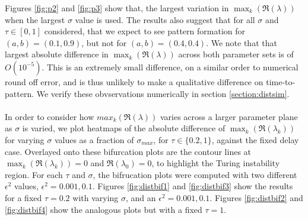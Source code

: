 Figures \ref{fig:p2} and \ref{fig:p3} show that, the largest variation in $\max_k(\Re(\lambda))$ when the largest $\sigma$ value is used. The results also suggest that for all $\sigma$ and $\tau\in[0,1]$ considered, that we expect to see pattern formation for $(a,b)=(0.1,0.9)$, but not for $(a,b)=(0.4,0.4)$. We note that that largest absolute difference in $\max_k(\Re(\lambda))$ across both parameter sets is of $O(10^{-5})$. This is an extremely small difference, on a similar order to numerical round off error, and is thus unlikely to make a qualitative difference on time-to-pattern. We verify these obvservations numerically in section \ref{section:distsim}.
\\\\
 In order to consider how $max_k(\Re(\lambda))$ varies across a larger parameter plane as $\sigma$ is varied, we plot heatmaps of the absolute difference of $\max_k(\Re(\lambda_k))$ for varying $\sigma$ values as a fraction of $\sigma_{max}$, for $\tau\in\{0.2,1\}$, against the fixed delay case. Overlayed onto these bifurcation plots are the contour lines at $\max_k(\Re(\lambda_k))=0$ and $\Re(\lambda_0)=0$, to highlight the Turing instability region. For each $\tau$ and $\sigma$, the bifrucation plots were computed with two different $\epsilon^2$ values, $\epsilon^2=0.001,0.1$. Figures \ref{fig:distbif1} and \ref{fig:distbif3} show the results for a fixed $\tau=0.2$ with varying $\sigma$, and an $\epsilon^2=0.001,0.1$. Figures \ref{fig:distbif2} and \ref{fig:distbif4} show the analogous plots but with a fixed $\tau=1$.

